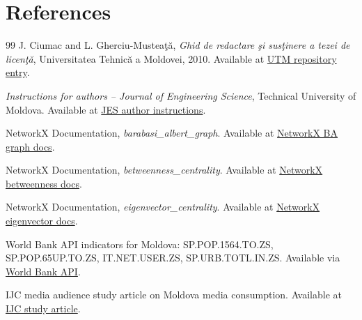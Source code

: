 \documentclass[11pt,a4paper]{article}
\begin{document}
\section*{References}
\begin{thebibliography}{99}
\sloppy
{}
J. Ciumac and L. Gherciu-Mustea\c{t}\u{a}, \emph{Ghid de redactare \c{s}i sus\c{t}inere a tezei de licen\c{t}\u{a}}, Universitatea Tehnic\u{a} a Moldovei, 2010. Available at \href{https://repository.utm.md/handle/5014/15847}{UTM repository entry}.

\emph{Instructions for authors -- Journal of Engineering Science}, Technical University of Moldova. Available at \href{https://jes.utm.md/instructions-for-authors/}{JES author instructions}.

NetworkX Documentation, \emph{barabasi\_albert\_graph}. Available at \href{https://networkx.org/documentation/stable/reference/generated/networkx.generators.random_graphs.barabasi_albert_graph.html}{NetworkX BA graph docs}.

NetworkX Documentation, \emph{betweenness\_centrality}. Available at \href{https://networkx.org/documentation/stable/reference/algorithms/generated/networkx.algorithms.centrality.betweenness_centrality.html}{NetworkX betweenness docs}.

NetworkX Documentation, \emph{eigenvector\_centrality}. Available at \href{https://networkx.org/documentation/stable/reference/algorithms/generated/networkx.algorithms.centrality.eigenvector_centrality.html}{NetworkX eigenvector docs}.

World Bank API indicators for Moldova: SP.POP.1564.TO.ZS, SP.POP.65UP.TO.ZS, IT.NET.USER.ZS, SP.URB.TOTL.IN.ZS. Available via \href{https://api.worldbank.org/}{World Bank API}.

IJC media audience study article on Moldova media consumption. Available at \href{https://cji.md/en/media-audience-study-launched-by-the-ijc-social-networks-have-become-the-main-source-of-information-for-media-consumers-in-the-republic-of-moldova/}{IJC study article}.
\end{thebibliography}
\end{document}
